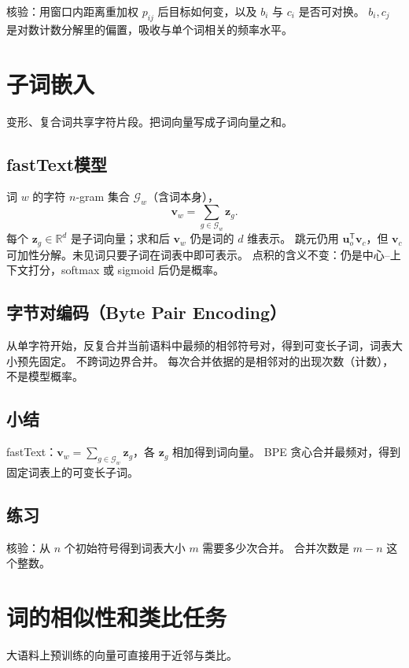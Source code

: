 核验：用窗口内距离重加权 $p_{ij}$ 后目标如何变，以及 $b_i$ 与 $c_i$ 是否可对换。
$b_i,c_j$ 是对数计数分解里的偏置，吸收与单个词相关的频率水平。

\section{子词嵌入}

变形、复合词共享字符片段。把词向量写成子词向量之和。

\subsection{fastText模型}

词 $w$ 的字符 $n$-gram 集合 $\mathcal{G}_w$（含词本身），
\[
\bm{v}_w=\sum_{g\in\mathcal{G}_w}\bm{z}_g.
\]
每个 $\bm{z}_g\in\mathbb{R}^{d}$ 是子词向量；求和后 $\bm{v}_w$ 仍是词的 $d$ 维表示。
跳元仍用 $\bm{u}_o^{\mathsf T}\bm{v}_c$，但 $\bm{v}_c$ 可加性分解。未见词只要子词在词表中即可表示。
点积的含义不变：仍是中心–上下文打分，softmax 或 sigmoid 后仍是概率。

\subsection{字节对编码（Byte Pair Encoding）}

从单字符开始，反复合并当前语料中最频的相邻符号对，得到可变长子词，词表大小预先固定。
不跨词边界合并。
每次合并依据的是相邻对的出现次数（计数），不是模型概率。

\subsection{小结}

fastText：$\bm{v}_w=\sum_{g\in\mathcal{G}_w}\bm{z}_g$，各 $\bm{z}_g$ 相加得到词向量。
BPE 贪心合并最频对，得到固定词表上的可变长子词。

\subsection{练习}

核验：从 $n$ 个初始符号得到词表大小 $m$ 需要多少次合并。
合并次数是 $m-n$ 这个整数。

\section{词的相似性和类比任务}

大语料上预训练的向量可直接用于近邻与类比。

